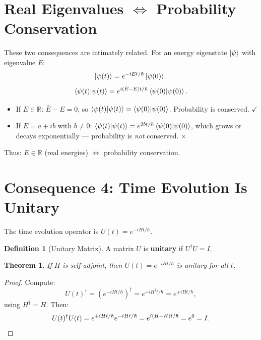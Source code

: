 \documentclass[11pt,a4paper]{article}
\theoremstyle{definition}
\newtheorem{definition}{Definition}[section]
\theoremstyle{plain}
\newtheorem{theorem}{Theorem}[section]
\theoremstyle{remark}
\begin{document}
\section{Real Eigenvalues $\Longleftrightarrow$ Probability Conservation}

These two consequences are intimately related. For an energy eigenstate $\ket{\psi}$ with eigenvalue $E$:
\[
    \ket{\psi(t)} = e^{-iEt/\hbar}\ket{\psi(0)}.
\]
\[
    \braket{\psi(t)}{\psi(t)} = e^{i(\bar{E} - E)t/\hbar}\braket{\psi(0)}{\psi(0)}.
\]

\begin{itemize}
    \item If $E \in \mathbb{R}$: $\bar{E} - E = 0$, so $\braket{\psi(t)}{\psi(t)} = \braket{\psi(0)}{\psi(0)}$. Probability is conserved. $\checkmark$
    \item If $E = a + ib$ with $b \neq 0$: $\braket{\psi(t)}{\psi(t)} = e^{2bt/\hbar}\braket{\psi(0)}{\psi(0)}$, which grows or decays exponentially --- probability is \emph{not} conserved. $\times$
\end{itemize}

Thus: $E \in \mathbb{R}$ (real energies) $\Longleftrightarrow$ probability conservation.

\section{Consequence 4: Time Evolution Is Unitary}

The time evolution operator is $U(t) = e^{-iHt/\hbar}$.

\begin{definition}[Unitary Matrix]
    A matrix $U$ is \textbf{unitary} if $U^\dagger U = I$.
\end{definition}

\begin{theorem}
    If $H$ is self-adjoint, then $U(t) = e^{-iHt/\hbar}$ is unitary for all $t$.
\end{theorem}

\begin{proof}
    Compute:
    \[
        U(t)^\dagger = \left(e^{-iHt/\hbar}\right)^\dagger = e^{+iH^\dagger t/\hbar} = e^{+iHt/\hbar},
    \]
    using $H^\dagger = H$. Then:
    \[
        U(t)^\dagger U(t) = e^{+iHt/\hbar}e^{-iHt/\hbar} = e^{i(H-H)t/\hbar} = e^0 = I. \qedhere
    \]
\end{proof}
\end{document}
